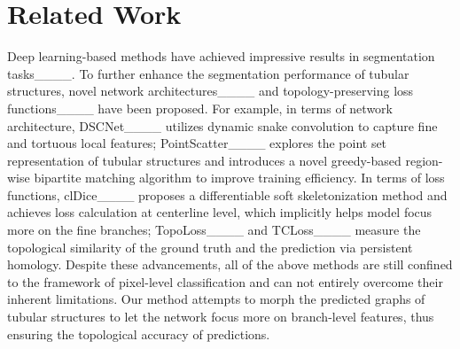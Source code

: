 \section{Related Work}
Deep learning-based methods have achieved impressive results in segmentation tasks____. To further enhance the segmentation performance of tubular structures, novel network architectures____ and topology-preserving loss functions____ have been proposed. For example, in terms of network architecture, DSCNet____ utilizes dynamic snake convolution to capture fine and tortuous local features; PointScatter____ explores the point set representation of tubular structures and introduces a novel greedy-based region-wise bipartite matching algorithm to improve training efficiency. In terms of loss functions, clDice____ proposes a differentiable soft skeletonization method and achieves loss calculation at centerline level, which implicitly helps model focus more on the fine branches; TopoLoss____ and TCLoss____ measure the topological similarity of the ground truth and the prediction via persistent homology. Despite these advancements, all of the above methods are still confined to the framework of pixel-level classification and can not entirely overcome their inherent limitations. Our method attempts to morph the predicted graphs of tubular structures to let the network focus more on branch-level features, thus ensuring the topological accuracy of predictions.


